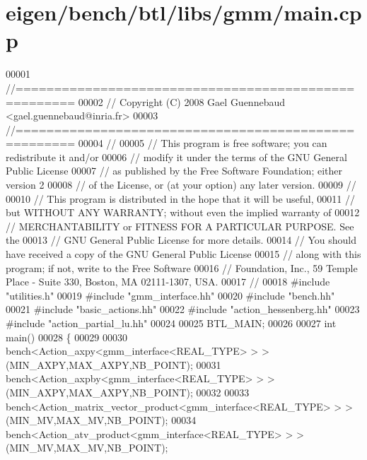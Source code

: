 \hypertarget{eigen_2bench_2btl_2libs_2gmm_2main_8cpp_source}{}\section{eigen/bench/btl/libs/gmm/main.cpp}
\label{eigen_2bench_2btl_2libs_2gmm_2main_8cpp_source}

\begin{DoxyCode}
00001 \textcolor{comment}{//=====================================================}
00002 \textcolor{comment}{// Copyright (C) 2008 Gael Guennebaud <gael.guennebaud@inria.fr>}
00003 \textcolor{comment}{//=====================================================}
00004 \textcolor{comment}{//}
00005 \textcolor{comment}{// This program is free software; you can redistribute it and/or}
00006 \textcolor{comment}{// modify it under the terms of the GNU General Public License}
00007 \textcolor{comment}{// as published by the Free Software Foundation; either version 2}
00008 \textcolor{comment}{// of the License, or (at your option) any later version.}
00009 \textcolor{comment}{//}
00010 \textcolor{comment}{// This program is distributed in the hope that it will be useful,}
00011 \textcolor{comment}{// but WITHOUT ANY WARRANTY; without even the implied warranty of}
00012 \textcolor{comment}{// MERCHANTABILITY or FITNESS FOR A PARTICULAR PURPOSE.  See the}
00013 \textcolor{comment}{// GNU General Public License for more details.}
00014 \textcolor{comment}{// You should have received a copy of the GNU General Public License}
00015 \textcolor{comment}{// along with this program; if not, write to the Free Software}
00016 \textcolor{comment}{// Foundation, Inc., 59 Temple Place - Suite 330, Boston, MA  02111-1307, USA.}
00017 \textcolor{comment}{//}
00018 \textcolor{preprocessor}{#include "utilities.h"}
00019 \textcolor{preprocessor}{#include "gmm\_interface.hh"}
00020 \textcolor{preprocessor}{#include "bench.hh"}
00021 \textcolor{preprocessor}{#include "basic\_actions.hh"}
00022 \textcolor{preprocessor}{#include "action\_hessenberg.hh"}
00023 \textcolor{preprocessor}{#include "action\_partial\_lu.hh"}
00024 
00025 BTL\_MAIN;
00026 
00027 \textcolor{keywordtype}{int} main()
00028 \{
00029 
00030   bench<Action\_axpy<gmm\_interface<REAL\_TYPE> > >(MIN\_AXPY,MAX\_AXPY,NB\_POINT);
00031   bench<Action\_axpby<gmm\_interface<REAL\_TYPE> > >(MIN\_AXPY,MAX\_AXPY,NB\_POINT);
00032 
00033   bench<Action\_matrix\_vector\_product<gmm\_interface<REAL\_TYPE> > >(MIN\_MV,MAX\_MV,NB\_POINT);
00034   bench<Action\_atv\_product<gmm\_interface<REAL\_TYPE> > >(MIN\_MV,MAX\_MV,NB\_POINT);

\end{DoxyCode}
